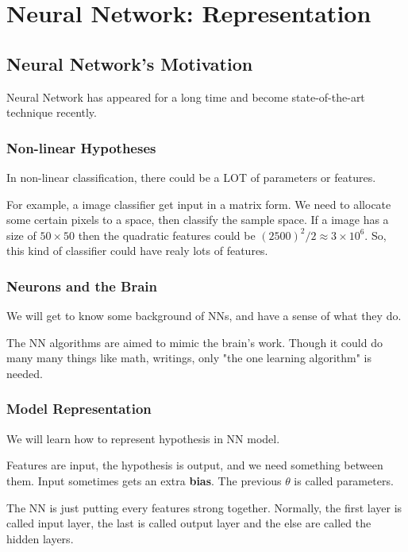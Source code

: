 \documentclass[en,11pt,english,black,simple]{../elegantbook}
\begin{document}
\fi 
\def\chapname{04nnrepresentation}

\chapter{Neural Network: Representation}

\section{Neural Network's Motivation}

Neural Network has appeared for a long time and become state-of-the-art technique recently.

\subsection{Non-linear Hypotheses}

In non-linear classification, there could be a LOT of parameters or features.

For example, a image classifier get input in a matrix form. We need to allocate some certain pixels to a space, then classify the sample space. If a image has a size of \(50 \times 50\) then the quadratic features could be \((2500)^2/2\approx 3 \times 10^6\). So, this kind of classifier could have realy lots of features.

\subsection{Neurons and the Brain}

We will get to know some background of NNs, and have a sense of what they do.

The NN algorithms are aimed to mimic the brain's work. Though it could do many many things like math, writings, only "the one learning algorithm" is needed.

\subsection{Model Representation}

We will learn how to represent hypothesis in NN model.

Features are input, the hypothesis is output, and we need something between them. Input sometimes gets an extra \textbf{bias}. The previous \(\theta\) is called parameters.

The NN is just putting every features strong together. Normally, the first layer is called input layer, the last is called output layer and the else are called the hidden layers.
\end{document}

